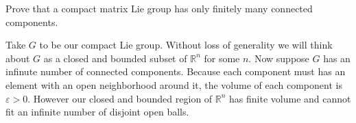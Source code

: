 \documentclass[pages,boxes,color=WildStrawberry]{homework}
\newcommand{\R}{\mathbb{R}}
\newcommand{\1}{\mathbb{1}}
\begin{document}
\begin{problem}
Prove that a compact matrix Lie group has only finitely many connected components.
\end{problem}

\begin{solution}
	Take $G$ to be our compact Lie group. Without loss of generality we will think about $G$ as a closed and bounded subset of $\R^n$ for some $n$. Now suppose $G$ has an infinute number of connected components. Because each component must has an element with an open neighborhood around it, the volume of each component is $\varepsilon > 0$. However our closed and bounded region of $\R^n$ has finite volume and cannot fit an infinite number of disjoint open balls.
\end{solution}
\end{document}
